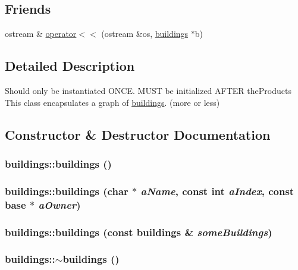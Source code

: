 \subsection*{Friends}
\begin{DoxyCompactItemize}
\item 
ostream \& \hyperlink{classbuildings_a2af3e65c7b1426fa2dd80c658ca99cd5}{operator$<$$<$} (ostream \&os, \hyperlink{classbuildings}{buildings} $\ast$b)
\end{DoxyCompactItemize}


\subsection{Detailed Description}
Should only be instantiated ONCE. MUST be initialized AFTER theProducts This class encapsulates a graph of \hyperlink{classbuildings}{buildings}. (more or less) 

\subsection{Constructor \& Destructor Documentation}
\hypertarget{classbuildings_affec7e1c753303f692e258d9adc3756a}{
\subsubsection[{buildings}]{\setlength{\rightskip}{0pt plus 5cm}buildings::buildings ()}}
\label{classbuildings_affec7e1c753303f692e258d9adc3756a}
\hypertarget{classbuildings_a3ed50eab88a240e472b7a26e6aaf6ecc}{
\subsubsection[{buildings}]{\setlength{\rightskip}{0pt plus 5cm}buildings::buildings (char $\ast$ {\em aName}, \/  const int {\em aIndex}, \/  const {\bf base} $\ast$ {\em aOwner})}}
\label{classbuildings_a3ed50eab88a240e472b7a26e6aaf6ecc}
\hypertarget{classbuildings_a73c0a2677e231fa95a78cd153dddc2ce}{
\subsubsection[{buildings}]{\setlength{\rightskip}{0pt plus 5cm}buildings::buildings (const {\bf buildings} \& {\em someBuildings})}}
\label{classbuildings_a73c0a2677e231fa95a78cd153dddc2ce}
\hypertarget{classbuildings_a4d070dc7165028bfc384c66d54c5d41a}{
\subsubsection[{$\sim$buildings}]{\setlength{\rightskip}{0pt plus 5cm}buildings::$\sim$buildings ()}}
\label{classbuildings_a4d070dc7165028bfc384c66d54c5d41a}


